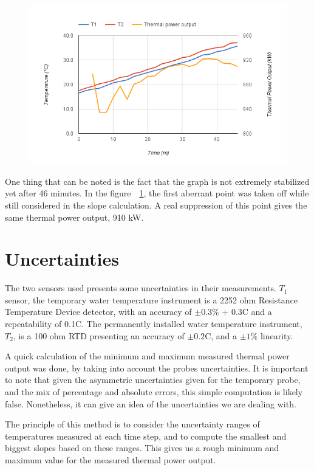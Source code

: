 \begin{figure}[t!]
	\centering
	\includegraphics[height=0.4\textheight]{fig02/calibration}
	\label{fig:powercal}
\end{figure}

One thing that can be noted is the fact that the graph is not extremely stabilized yet after 46 minutes. In the figure~~\ref{fig:powercal}, the first aberrant point was taken off while still considered in the slope calculation. A real suppression of this point gives the same thermal power output, 910 kW.


\section{Uncertainties}
\label{sec:uncertainties}

The two sensors used presents some uncertainties in their measurements. $T_1$ sensor, the temporary water temperature instrument is a 2252 ohm Resistance Temperature Device detector, with an accuracy of $\pm0.3$\% + 0.3\degree C and a repeatability of 0.1\degree C. The permanently installed water temperature instrument, $T_2$, is a 100 ohm RTD presenting an accuracy of $\pm0.2$\degree C, and a $\pm1$\% linearity.

A quick calculation of the minimum and maximum measured thermal power output was done, by taking into account the probes uncertainties. It is important to note that given the asymmetric uncertainties given for the temporary probe, and the mix of percentage and absolute errors, this simple computation is likely false. Nonetheless, it can give an idea of the uncertainties we are dealing with.

The principle of this method is to consider the uncertainty ranges of temperatures measured at each time step, and to compute the smallest and biggest slopes based on these ranges. This gives us a rough minimum and maximum value for the measured thermal power output.


